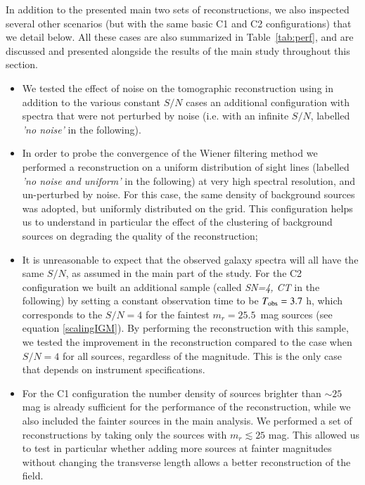 \documentclass{aa}
\begin{document}
In addition to the presented main two sets of reconstructions, we also inspected several other scenarios (but with the same basic C1 and C2 configurations) that we detail below. All these cases are also summarized in Table~\ref{tab:perf}, and are discussed and presented alongside the results of the main study throughout this section.
\begin{itemize}[noitemsep,nolistsep]
\item We tested the effect of noise on the tomographic reconstruction using in addition to the various constant $S/N$ cases an additional configuration with spectra that were not perturbed by noise (i.e. with an infinite $S/N$, labelled {\it \textup{'no noise'}} in the following).\item In order to probe the convergence of the Wiener filtering method we performed a reconstruction on a uniform distribution of sight lines (labelled {\it \textup{'no noise and uniform'}} in the following) at very high spectral resolution, and un-perturbed by noise. For this case, the same density of background sources was adopted, but uniformly distributed on the grid. This configuration helps us to understand in particular the effect of the clustering of background sources on degrading the quality of the reconstruction; 
\item It is unreasonable to expect that the observed galaxy spectra will all have the same $S/N$, as assumed in the main part of the study. For the C2 configuration we built an additional sample (called {\it SN=4, CT} in the following) by setting a constant observation time to be $T_{\rm obs} = 3.7$ h, which corresponds to the $S/N = 4$ for the faintest $m_{r} = 25.5$~mag sources (see equation \ref{scalingIGM}). By performing the reconstruction with this sample, we tested the improvement in the reconstruction compared to the case when $S/N=4$ for all sources, regardless of the magnitude. This is the only case that depends on instrument specifications.
\item For the C1 configuration the number density of sources brighter than $\sim 25$ mag is already sufficient for the performance of the reconstruction, while we also included the fainter sources in the main analysis. We performed a set of reconstructions by taking only the sources with $m_{r} \lesssim 25$ mag. This allowed us to test in particular whether adding more sources at fainter magnitudes without changing the transverse length allows a better reconstruction of the field. 
\end{itemize}
\end{document}

